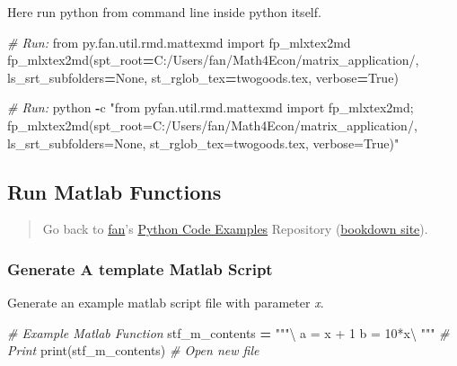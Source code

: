 \documentclass[
]{book}
\newenvironment{Shaded}{\begin{snugshade}}{\end{snugshade}}
\newcommand{\BuiltInTok}[1]{#1}
\newcommand{\CommentTok}[1]{\textcolor[rgb]{0.56,0.35,0.01}{\textit{#1}}}
\newcommand{\ImportTok}[1]{#1}
\newcommand{\NormalTok}[1]{#1}
\newcommand{\OperatorTok}[1]{\textcolor[rgb]{0.81,0.36,0.00}{\textbf{#1}}}
\newcommand{\StringTok}[1]{\textcolor[rgb]{0.31,0.60,0.02}{#1}}
\newcommand{\VariableTok}[1]{\textcolor[rgb]{0.00,0.00,0.00}{#1}}
\begin{document}
Here run python from command line inside python itself.

\begin{Shaded}
\begin{Highlighting}[]
\CommentTok{\# Run:}
\ImportTok{from}\NormalTok{ py.fan.util.rmd.mattexmd }\ImportTok{import}\NormalTok{ fp\_mlxtex2md}
\NormalTok{fp\_mlxtex2md(spt\_root}\OperatorTok{=}\StringTok{\textquotesingle{}C:/Users/fan/Math4Econ/matrix\_application/\textquotesingle{}}\NormalTok{, ls\_srt\_subfolders}\OperatorTok{=}\VariableTok{None}\NormalTok{, st\_rglob\_tex}\OperatorTok{=}\StringTok{\textquotesingle{}twogoods.tex\textquotesingle{}}\NormalTok{, verbose}\OperatorTok{=}\VariableTok{True}\NormalTok{)}
\end{Highlighting}
\end{Shaded}

\begin{Shaded}
\begin{Highlighting}[]
\CommentTok{\# Run:}
\NormalTok{python }\OperatorTok{{-}}\NormalTok{c }\StringTok{"from pyfan.util.rmd.mattexmd import fp\_mlxtex2md; fp\_mlxtex2md(spt\_root=\textquotesingle{}C:/Users/fan/Math4Econ/matrix\_application/\textquotesingle{}, ls\_srt\_subfolders=None, st\_rglob\_tex=\textquotesingle{}twogoods.tex\textquotesingle{}, verbose=True)"}
\end{Highlighting}
\end{Shaded}

\hypertarget{run-matlab-functions}{%
\subsection{Run Matlab Functions}\label{run-matlab-functions}}

\begin{quote}
Go back to \href{http://fanwangecon.github.io/}{fan}'s \href{https://fanwangecon.github.io/pyfan/}{Python Code Examples} Repository (\href{https://fanwangecon.github.io/pyfan/bookdown}{bookdown site}).
\end{quote}

\hypertarget{generate-a-template-matlab-script}{%
\subsubsection{Generate A template Matlab Script}\label{generate-a-template-matlab-script}}

Generate an example matlab script file with parameter \emph{x}.

\begin{Shaded}
\begin{Highlighting}[]
\CommentTok{\# Example Matlab Function}
\NormalTok{stf\_m\_contents }\OperatorTok{=} \StringTok{"""\textbackslash{}}
\StringTok{a = x + 1}
\StringTok{b = 10*x\textbackslash{}}
\StringTok{"""}
\CommentTok{\# Print}
\BuiltInTok{print}\NormalTok{(stf\_m\_contents)}
\CommentTok{\# Open new file}
\end{Highlighting}
\end{Shaded}
\end{document}
